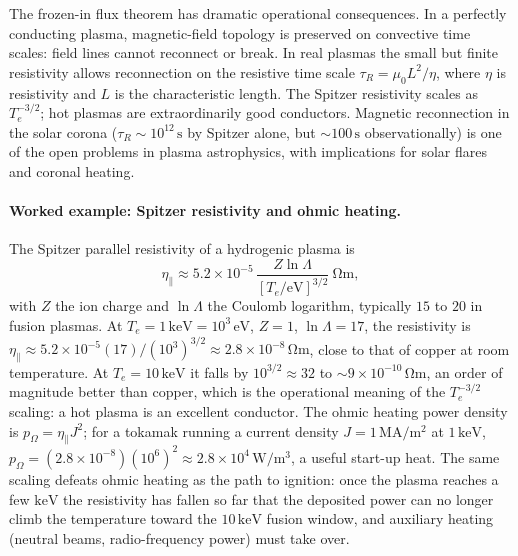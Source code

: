 The frozen-in flux theorem has dramatic operational consequences. In
a perfectly conducting plasma, magnetic-field topology is preserved
on convective time scales: field lines cannot reconnect or break. In
real plasmas the small but finite resistivity allows reconnection on
the resistive time scale $\tau_{R} = \mu_{0}L^{2}/\eta$, where $\eta$
is resistivity and $L$ is the characteristic length. The Spitzer
resistivity scales as $T_{e}^{-3/2}$; hot plasmas are extraordinarily
good conductors. Magnetic reconnection in the solar corona ($\tau_{R}
\sim 10^{12}\,\si{\second}$ by Spitzer alone, but $\sim 100\,\si{
\second}$ observationally) is one of the open problems in plasma
astrophysics, with implications for solar flares and coronal heating.

\paragraph{Worked example: Spitzer resistivity and ohmic heating.}
The Spitzer parallel resistivity of a hydrogenic plasma is
\[
\eta_{\parallel} \approx 5.2\times 10^{-5}\,
\frac{Z\ln\Lambda}{[T_e/\text{eV}]^{3/2}}\ \si{\ohm\meter},
\]
with $Z$ the ion charge and $\ln\Lambda$ the Coulomb logarithm, typically
$15$ to $20$ in fusion plasmas. At $T_e = 1\,\si{\kilo\electronvolt} =
10^{3}\,\text{eV}$, $Z = 1$, $\ln\Lambda = 17$, the resistivity is
$\eta_{\parallel} \approx 5.2\times 10^{-5}(17)/(10^{3})^{3/2} \approx
2.8\times 10^{-8}\,\si{\ohm\meter}$, close to that of copper at room
temperature. At $T_e = 10\,\si{\kilo\electronvolt}$ it falls by $10^{3/2}
\approx 32$ to $\sim 9\times 10^{-10}\,\si{\ohm\meter}$, an order of
magnitude better than copper, which is the operational meaning of the
$T_e^{-3/2}$ scaling: a hot plasma is an excellent conductor. The ohmic
heating power density is $p_{\Omega} = \eta_{\parallel}J^{2}$; for a tokamak
running a current density $J = 1\,\si{\mega\ampere\per\meter\squared}$ at
$1\,\si{\kilo\electronvolt}$, $p_{\Omega} = (2.8\times 10^{-8})(10^{6})^{2}
\approx 2.8\times 10^{4}\,\si{\watt\per\meter\cubed}$, a useful start-up
heat. The same scaling defeats ohmic heating as the path to ignition: once
the plasma reaches a few $\si{\kilo\electronvolt}$ the resistivity has
fallen so far that the deposited power can no longer climb the temperature
toward the $10\,\si{\kilo\electronvolt}$ fusion window, and auxiliary
heating (neutral beams, radio-frequency power) must take over.

